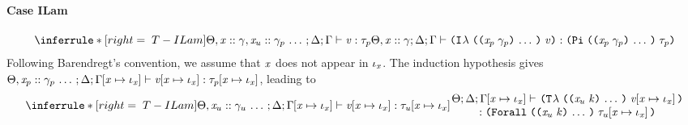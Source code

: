 \begin{sproof}
  \paragraph{Case {\sc ILam}}
  \[{\infr[T-ILam]
    {\typeof{\sEnv, \hassort{\var}{\sort},
        \sequence{\haskind{\var_u}{\sort_p}}}
      {\kEnv}{\tEnv}
      {\val}{\type_p}}
    {\typeof{\sEnv, \hassort{\var}{\sort}}{\kEnv}{\tEnv}
      {\ilam{\sequence{\notevar{\var_p}{\sort_p}}}{\val}}
      {\typedprod{\sequence{\notevar{\var_p}{\sort_p}}}{\type_p}}}}\]
  Following Barendregt's convention,
  we assume that $\mathit{x}$ does not appear in $\mathit{\iota}_{\mathit{x}}$.
  The induction hypothesis gives
  $\Theta, \mathit{x}_p :: \mathit{\gamma}_p \, \ldots \,;\Delta;\Gamma\hspace{-2pt}\left[ \mathit{x} \mapsto \mathit{\iota}_{\mathit{x}} \right] \vdash \mathit{v}\hspace{-2pt}\left[ \mathit{x} \mapsto \mathit{\iota}_{\mathit{x}} \right] : \mathit{\tau}_p\hspace{-2pt}\left[ \mathit{x} \mapsto \mathit{\iota}_{\mathit{x}} \right]$,
  leading to
  \[{\infr[T-ILam]
    {\typeof{\sEnv, \sequence{\hassort{\var_u}{\sort_u}}}{\kEnv}
      {\idxsubst{\tEnv}}
      {\idxsubst{\val}}{\idxsubst{\type_u}}}
    {\parbox{0.6\textwidth}
      {\centering
        \({\sEnv};{\kEnv};{\idxsubst{\tEnv}}\vdash\)
        \({\tlam{\sequence{\notevar{\var_u}{\kind}}}{\idxsubst{\val}}}\)
        \(:{\typeuniv{\sequence{\notevar{\var_u}{\kind}}}{\idxsubst{\type_u}}}\)}}}\]

\end{sproof}
